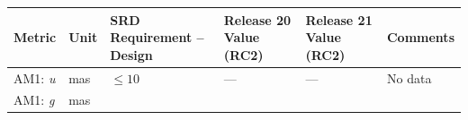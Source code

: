 \documentclass[DM,toc]{lsstdoc}
\begin{document}
\begin{longtable}[]{@{}llllll@{}}
\toprule
\begin{minipage}[b]{0.12\columnwidth}\raggedright\strut
Metric\strut
\end{minipage} & \begin{minipage}[b]{0.06\columnwidth}\raggedright\strut
Unit\strut
\end{minipage} & \begin{minipage}[b]{0.14\columnwidth}\raggedright\strut
SRD Requirement -- Design\strut
\end{minipage} & \begin{minipage}[b]{0.12\columnwidth}\raggedright\strut
Release 20 Value (RC2)\strut
\end{minipage} & \begin{minipage}[b]{0.12\columnwidth}\raggedright\strut
Release 21 Value (RC2) \strut
\end{minipage} & \begin{minipage}[b]{0.17\columnwidth}\raggedright\strut
Comments\strut
\end{minipage}\tabularnewline
\midrule
\endhead
\begin{minipage}[t]{0.12\columnwidth}\raggedright\strut
AM1: \emph{u}\strut
\end{minipage} & \begin{minipage}[t]{0.06\columnwidth}\raggedright\strut
mas\strut
\end{minipage} & \begin{minipage}[t]{0.14\columnwidth}\raggedright\strut
\(\leq 10\)\strut
\end{minipage} & \begin{minipage}[t]{0.12\columnwidth}\raggedright\strut
---\strut
\end{minipage} & \begin{minipage}[t]{0.12\columnwidth}\raggedright\strut
--- \strut
\end{minipage} & \begin{minipage}[t]{0.17\columnwidth}\raggedright\strut
No data\strut
\end{minipage}\tabularnewline
\begin{minipage}[t]{0.12\columnwidth}\raggedright\strut
AM1: \emph{g}\strut
\end{minipage} & \begin{minipage}[t]{0.06\columnwidth}\raggedright\strut
mas\strut
\end{minipage} & \begin{minipage}[t]{0.14\columnwidth}\raggedright\strut

\end{minipage}
\end{longtable}
\end{document}
